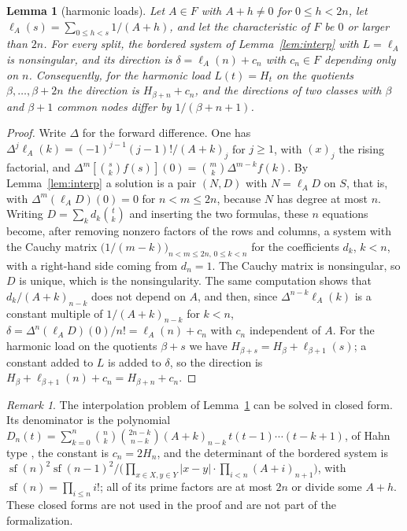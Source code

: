 \documentclass[11pt]{amsart}
\newtheorem{lemma}[theorem]{Lemma}
\theoremstyle{definition}
\theoremstyle{remark}
\newtheorem{remark}[theorem]{Remark}
\numberwithin{equation}{section}
\begin{document}
\begin{lemma}[harmonic loads]\label{lem:harmonic}
Let $A\in F$ with $A+h\ne0$ for $0\le h<2n$, let $\ell_A(s)=\sum_{0\le h<s}1/(A+h)$, and let the characteristic of $F$ be $0$ or
larger than $2n$. For every split, the bordered system of Lemma~\ref{lem:interp} with $L=\ell_A$ is nonsingular, and its
direction is $\delta=\ell_A(n)+c_n$ with $c_n\in F$ depending only on $n$. Consequently, for the harmonic load
$L(t)=H_t$ on the quotients $\beta,\dots,\beta+2n$ the direction is $H_{\beta+n}+c_n$, and the directions of two classes with
$\beta$ and $\beta+1$ common nodes differ by $1/(\beta+n+1)$.
\end{lemma}
\begin{proof}
Write $\Delta$ for the forward difference. One has $\Delta^j\ell_A(k)=(-1)^{j-1}(j-1)!/(A+k)_j$ for $j\ge1$, with $(x)_j$ the
rising factorial, and $\Delta^m[\binom{s}{k}f(s)](0)=\binom mk\Delta^{m-k}f(k)$. By Lemma~\ref{lem:interp} a solution is a
pair $(N,D)$ with $N=\ell_AD$ on $S$, that is, with $\Delta^m(\ell_AD)(0)=0$ for $n<m\le2n$, because $N$ has degree at most $n$.
Writing $D=\sum_kd_k\binom tk$ and inserting the two formulas, these $n$ equations become, after removing nonzero factors
of the rows and columns, a system with the Cauchy matrix $\bigl(1/(m-k)\bigr)_{n<m\le2n,\,0\le k<n}$ for the coefficients
$d_k$, $k<n$, with a right-hand side coming from $d_n=1$. The Cauchy matrix is nonsingular, so $D$ is unique, which is
the nonsingularity. The same computation shows that $d_k/(A+k)_{n-k}$ does not depend on $A$, and then, since
$\Delta^{n-k}\ell_A(k)$ is a constant multiple of $1/(A+k)_{n-k}$ for $k<n$,
$\delta=\Delta^n(\ell_AD)(0)/n!=\ell_A(n)+c_n$ with $c_n$ independent of $A$. For the harmonic load on the quotients
$\beta+s$ we have $H_{\beta+s}=H_\beta+\ell_{\beta+1}(s)$; a constant added to $L$ is added to $\delta$, so the direction is
$H_\beta+\ell_{\beta+1}(n)+c_n=H_{\beta+n}+c_n$.
\end{proof}

\begin{remark}\label{rem:hahn}
The interpolation problem of Lemma~\ref{lem:harmonic} can be solved in closed form. Its denominator is the polynomial
$D_n(t)=\sum_{k=0}^n\binom nk\binom{2n-k}{n-k}(A+k)_{n-k}\,t(t-1)\cdots(t-k+1)$, of Hahn type \cite{KLS}, the constant is
$c_n=2H_n$, and the determinant of the bordered system is
$\operatorname{sf}(n)^2\operatorname{sf}(n-1)^2\big/\bigl(\prod_{x\in X,y\in Y}|x-y|\cdot\prod_{i<n}(A+i)_{n+1}\bigr)$, with
$\operatorname{sf}(n)=\prod_{i\le n}i!$; all of its prime factors are at most $2n$ or divide some $A+h$. These closed forms are
not used in the proof and are not part of the formalization.
\end{remark}
\end{document}
